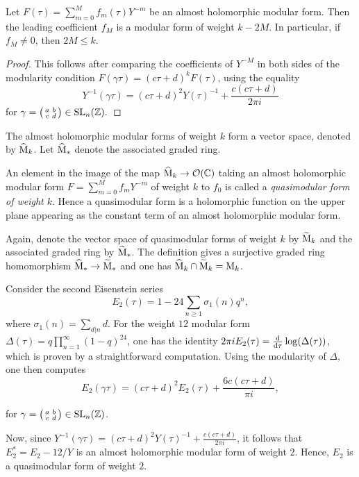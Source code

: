 \begin{cor}
 Let $F(\tau)=\sum_{m=0}^Mf_m(\tau)Y^{-m}$ be an almost holomorphic modular form. Then the leading coefficient $f_M$ is a modular form of weight $k-2M$. In particular, if $f_M \neq 0$, then $2M \leq k$.
\end{cor}
\begin{proof}
 This follows after comparing the coefficients of $Y^{-M}$ in both sides of the modularity condition $F(\gamma\tau)=(c\tau+d)^kF(\tau)$, using the equality \[Y^{-1}(\gamma\tau)=(c\tau+d)^2Y(\tau)^{-1}+\frac{c(c\tau+d)}{2\pi i}\]
 for $\gamma=
 \bigl(\begin{smallmatrix}
 a&b\\ c&d
 \end{smallmatrix} \bigr)
 \in \operatorname{SL}_n(\mathbb{Z}).$
\end{proof}


The almost holomorphic modular forms of weight $k$ form a vector space, denoted by $\widehat{\mathrm{M}}_k$. Let $\widehat{\mathrm{M}}_*$ denote the associated graded ring.

\begin{defi}
 An element in the image of the map $\widehat{\mathrm{M}}_k\to\mathcal{O}(\mathbb{C})$ taking an almost holomorphic modular form $F=\sum_{m=0}^Mf_mY^{-m}$ of weight $k$ to $f_0$ is called a \emph{quasimodular form of weight $k$}. Hence a quasimodular form is a holomorphic function on the upper plane appearing as the constant term of an almost holomorphic modular form.
\end{defi}

Again, denote the vector space of quasimodular forms of weight $k$ by $\widetilde{\mathrm{M}}_k$ and the associated graded ring by $\widetilde{\mathrm{M}}_*$. The definition gives a surjective graded ring homomorphism $\widehat{\mathrm{M}}_*\to\widetilde{\mathrm{M}}_*$ and one has $\widehat{\mathrm{M}}_k \cap \widetilde{\mathrm{M}}_k = \mathrm{M}_k$.

\begin{expl}

Consider the second Eisenstein series \[E_2(\tau)=1-24\sum_{n\geq1}\sigma_1(n)q^n,\] where $\sigma_1(n)=\sum_{d|n}d$. For the weight $12$ modular form $\Delta(\tau)=q\prod_{n=1}^{\infty}(1-q)^{24}$, one has the identity $2\pi iE_2(\tau)=\frac{\mathrm{d}}{\mathrm{d}\tau}\log(\Delta(\tau))$, which is proven by a straightforward computation. Using the modularity of $\Delta$, one then computes \[E_2(\gamma\tau)=(c\tau+d)^2 E_2(\tau) + \frac{6c(c\tau+d)}{\pi i},\]

for $\gamma=
 \bigl(\begin{smallmatrix}
 a&b\\ c&d
 \end{smallmatrix} \bigr)
 \in \operatorname{SL}_n(\mathbb{Z})$.

Now, since $Y^{-1}(\gamma\tau)=(c\tau+d)^2Y(\tau)^{-1}+\frac{c(c\tau+d)}{2\pi i}$, it follows that $E_2^*=E_2-12/Y$ is an almost holomorphic modular form of weight $2$. Hence, $E_2$ is a quasimodular form of weight $2$.

\end{expl}

